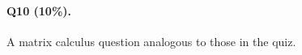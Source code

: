 \documentclass[11pt]{article}
\numberwithin{equation}{section}
\begin{document}
\paragraph{Q10 (10\%).} 
A matrix calculus question analogous to those in the quiz.




%

%
%
%
\end{document}
